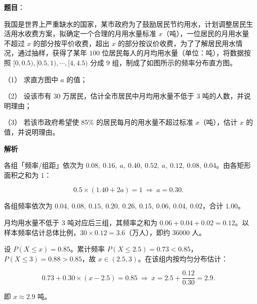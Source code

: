 \begin{answer}

\textbf{题目}：

我国是世界上严重缺水的国家，某市政府为了鼓励居民节约用水，计划调整居民生活用水收费方案，拟确定一个合理的月用水量标准 \(x\)（吨），一位居民的月用水量不超过 \(x\) 的部分按平价收费，超出 \(x\) 的部分按议价收费，为了了解居民用水情况，通过抽样，获得了某年 \(100\) 位居民每人的月均用水量（单位：吨），将数据按照 \([0,0.5),[0.5,1),\cdots,[4,4.5)\) 分成 \(9\) 组，制成了如图所示的频率分布直方图。
\nopagebreak[4]
\begin{center}\end{center}
\nopagebreak[4]
（1） 求直方图中 \(a\) 的值；

（2） 设该市有 \(30\) 万居民，估计全市居民中月均用水量不低于 \(3\) 吨的人数，并说明理由；

（3） 若该市政府希望使 85\% 的居民每月的用水量不超过标准 \(x\)（吨），估计 \(x\) 的值，并说明理由。

\textbf{解析}


各组「频率/组距」依次为 \(0.08,\ 0.16,\ a,\ 0.40,\ 0.52,\ a,\ 0.12,\ 0.08,\ 0.04\)。由各矩形面积之和为 \(1\)：

\nopagebreak[4]
\[
0.5\times(1.40+2a)=1\ \Longrightarrow\ a=0.30.
\]

各组频率依次为 \(0.04,\ 0.08,\ 0.15,\ 0.20,\ 0.26,\ 0.15,\ 0.06,\ 0.04,\ 0.02\)，合计 \(1.00\)。


月均用水量不低于 \(3\) 吨对应后三组，其频率之和为 \(0.06+0.04+0.02=0.12\)。以样本频率估计总体比例，\(30\times0.12=3.6\)（万人），即约 \(36000\) 人。


设 \(P(X\leqslant x)=0.85\)。累计频率 \(P(X\leqslant2.5)=0.73<0.85\)，\(P(X\leqslant3)=0.88>0.85\)，故 \(x\in(2.5,3)\)。在该组内按均匀分布估计：

\nopagebreak[4]
\[
0.73+0.30\times(x-2.5)=0.85\ \Longrightarrow\ x=2.5+\frac{0.12}{0.30}=2.9.
\]

即 \(x\approx2.9\) 吨。




\end{answer}
